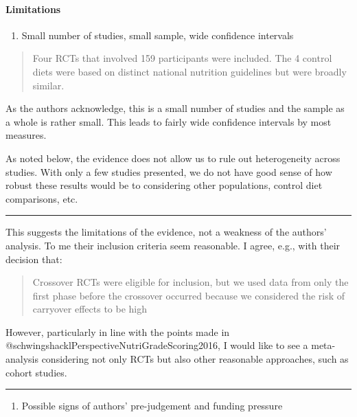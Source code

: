 \documentclass[]{article}
\providecommand{\tightlist}{%
  \setlength{\itemsep}{0pt}\setlength{\parskip}{0pt}}
\let\oldparagraph\paragraph
\renewcommand{\paragraph}[1]{\oldparagraph{#1}\mbox{}}
\begin{document}
\hypertarget{limitations}{%
\paragraph{Limitations}\label{limitations}}

\begin{enumerate}
\def\labelenumi{\arabic{enumi}.}
\tightlist
\item
  Small number of studies, small sample, wide confidence intervals
\end{enumerate}

\begin{quote}
Four RCTs that involved 159 participants were included. The 4 control
diets were based on distinct national nutrition guidelines but were
broadly similar.
\end{quote}

As the authors acknowledge, this is a small number of studies and the
sample as a whole is rather small. This leads to fairly wide confidence
intervals by most measures.

As noted below, the evidence does not allow us to rule out heterogeneity
across studies. With only a few studies presented, we do not have good
sense of how robust these results would be to considering other
populations, control diet comparisons, etc.

\begin{center}\rule{0.5\linewidth}{0.5pt}\end{center}

This suggests the limitations of the evidence, not a weakness of the
authors' analysis. To me their inclusion criteria seem reasonable. I
agree, e.g., with their decision that:

\begin{quote}
Crossover RCTs were eligible for inclusion, but we used data from only
the first phase before the crossover occurred because we considered the
risk of carryover effects to be high
\end{quote}

However, particularly in line with the points made in
@schwingshacklPerspectiveNutriGradeScoring2016, I would like to see a
meta-analysis considering not only RCTs but also other reasonable
approaches, such as cohort studies.

\begin{center}\rule{0.5\linewidth}{0.5pt}\end{center}

\begin{enumerate}
\def\labelenumi{\arabic{enumi}.}
\setcounter{enumi}{1}
\tightlist
\item
  Possible signs of authors' pre-judgement and funding pressure
\end{enumerate}
\end{document}
